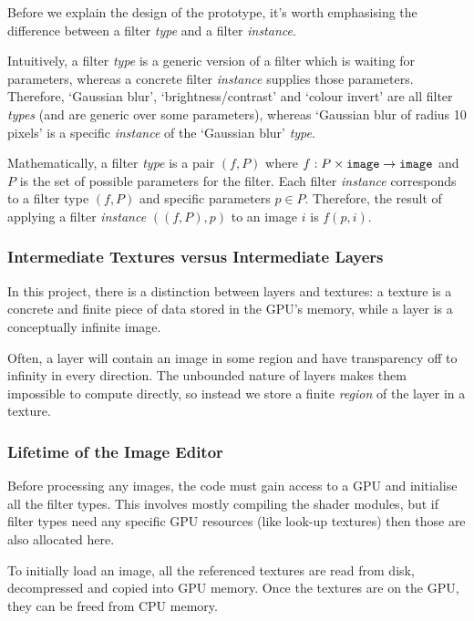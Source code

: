 \documentclass[12pt]{article}
\begin{document}
Before we explain the design of the prototype, it's worth emphasising the difference between a
filter \emph{type} and a filter \emph{instance}.

Intuitively, a filter \emph{type} is a generic version of a filter which is waiting for parameters,
whereas a concrete filter \emph{instance} supplies those parameters.  Therefore, `Gaussian blur',
`brightness/contrast' and `colour invert' are all filter \emph{types} (and are generic over some
parameters), whereas `Gaussian blur of radius 10 pixels' is a specific \emph{instance} of the
`Gaussian blur' \emph{type}.

Mathematically, a filter \emph{type} is a pair $(f, P)$ where $f: P \times \verb|image| \rightarrow
\verb|image|$ and $P$ is the set of possible parameters for the filter.  Each filter \emph{instance}
corresponds to a filter type $(f, P)$ and specific parameters $p \in P$.  Therefore, the result of
applying a filter \emph{instance} $((f, P), p)$ to an image $i$ is $f(p, i)$.

\subsubsection{Intermediate Textures versus Intermediate Layers}

In this project, there is a distinction between layers and textures: a texture is a concrete and
finite piece of data stored in the GPU's memory, while a layer is a conceptually infinite image.

Often, a layer will contain an image in some region and have transparency off to infinity in every
direction.  The unbounded nature of layers makes them impossible to compute directly, so instead we
store a finite \emph{region} of the layer in a texture.

\subsubsection{Lifetime of the Image Editor}

Before processing any images, the code must gain access to a GPU and initialise all the filter
types.  This involves mostly compiling the shader modules, but if filter types need any specific GPU
resources (like look-up textures) then those are also allocated here.

To initially load an image, all the referenced textures are read from disk, decompressed and copied
into GPU memory.  Once the textures are on the GPU, they can be freed from CPU memory.
\end{document}
